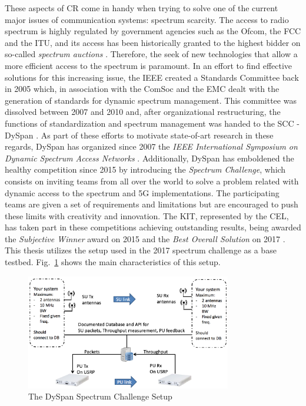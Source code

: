 These aspects of \ac{CR} come in handy when trying to solve one of the current major issues of communication systems: spectrum scarcity. The access to radio spectrum is highly regulated by government agencies such as the \ac{Ofcom}, the \ac{FCC} and the \ac{ITU}, and its access has been historically granted to the highest bidder on so-called \emph{spectrum auctions} \cite{Jondral2005} \cite{Staple2004}. Therefore, the seek of new technologies that allow a more efficient access to the spectrum is paramount. In an effort to find effective solutions for this increasing issue, the \ac{IEEE} created a Standards Committee back in 2005 which, in association with the \ac{ComSoc} and the \ac{EMC} dealt with the generation of standards for dynamic spectrum management. This committee was dissolved between 2007 and 2010 and, after organizational restructuring, the functions of standardization and spectrum management was handed to the \ac{SCC} - \ac{DySpan} \cite{IEEEDySPAN2015}. As part of these efforts to motivate state-of-art research in these regards, \ac{DySpan} has organized since 2007 the \emph{IEEE International Symposium on Dynamic Spectrum Access Networks} \cite{Comsoc}. Additionally, \ac{DySpan} has emboldened the healthy competition since 2015 by introducing the \emph{Spectrum Challenge}, which consists on inviting teams from all over the world to solve a problem related with dynamic access to the spectrum and 5G implementations. The participating teams are given a set of requirements and limitations but are encouraged to push these limits with creativity and innovation. The \ac{KIT}, represented by the \ac{CEL}, has taken part in these competitions achieving outstanding results, being awarded the \emph{Subjective Winner} award on 2015 \cite{Kaushik2015} and the \emph{Best Overall Solution} on 2017 \cite{Wunsch2017a}. This thesis utilizes the setup used in the 2017 spectrum challenge as a base testbed. Fig.~\ref{fig:dyspan_setup} shows the main characteristics of this setup.

\begin{figure}[htb]
    \centering
      \includegraphics[width=0.8\textwidth]{figures/dyspan_set.png}
      \caption{The DySpan Spectrum Challenge Setup \cite{Dyspanchalle}}
      \label{fig:dyspan_setup}
\end{figure}


